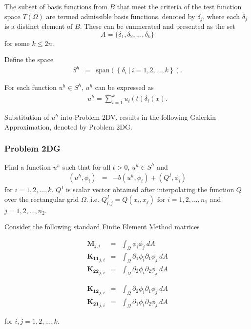 The subset of basis functions from $B$ that meet the criteria of the test function space $T(\Omega)$ are termed admissible basis functions, denoted by $\delta_j$, where each $\delta_j$ is a distinct element of $B$. These can be enumerated and presented as the set 
$$A = \{\delta_1, \delta_2,..., \delta_k \}$$ 
for some $k \leq 2n$.

Define the space
\begin{eqnarray*}
S^h & = & \textrm{span}\left(\left\{\delta_i \ | \ i = 1,2,...,k \right\} \right).
\end{eqnarray*}

For each function $u^h \in S^h$, $u^h$ can be expressed as
\begin{eqnarray*}
	u^h = \sum_{i = 1}^{k} u_i(t) \delta_{i}(x).
\end{eqnarray*}

Substitution of $u^h$ into Problem 2DV, results in the following Galerkin Approximation, denoted by Problem 2DG.

\subsubsection*{Problem 2DG}
Find a function $u^h$ such that for all $t>0$, $u^h \in S^h$ and
\begin{eqnarray*}
	(u^h, \phi_i) & = & -b(u^h,\phi_i) + (Q^I, \phi_i)
\end{eqnarray*} for $i = 1,2,...,k$. $Q^I$ is scalar vector obtained after interpolating the function $Q$ over the rectangular grid $\Omega$. i.e. $Q^I_{i,j} = Q(x_i,x_j)$ for $i = 1,2,...,n_1$ and $j = 1,2,...,n_2$.


Consider the following standard Finite Element Method matrices

\noindent\begin{minipage}{.5\linewidth}
	\begin{eqnarray*}
		\mathbf{M}_{j,i} & = & \int_{\Omega} \phi_i \phi_j ~dA \\
		\mathbf{{K}_{11}}_{j,i} & = & \int_{\Omega} \partial_1\phi_i \partial_1\phi_j~dA\\
		\mathbf{{K}_{22}}_{j,i} & = & \int_{\Omega} \partial_2\phi_i \partial_2\phi_j~dA
	\end{eqnarray*}
\end{minipage}%
\begin{minipage}{.5\linewidth}
	\begin{eqnarray*}
		\mathbf{{K}_{12}}_{j,i} & = & \int_{\Omega} \partial_2\phi_i \partial_1\phi_j~dA\\
		\mathbf{{K}_{21}}_{j,i} & = & \int_{\Omega} \partial_1\phi_i \partial_2\phi_j~dA
	\end{eqnarray*}
\end{minipage}
for $i,j = 1,2,...,k$.

